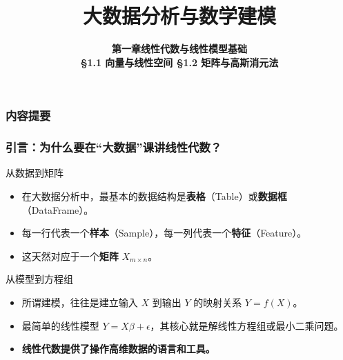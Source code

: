 \usepackage{nicematrix}


\title[大数据分析与数学建模]{\texorpdfstring{\LARGE \bfseries 大数据分析与数学建模}{大数据分析与数学建模}}
\author[线性代数基础(1)]
{\Large \bfseries 第一章\quad 线性代数与线性模型基础 \\ \vspace{0.5em} \large \S 1.1 向量与线性空间 \quad \S 1.2 矩阵与高斯消元法}
\date{}





\begin{frame}
\titlepage
\end{frame}


\begin{frame}
\frametitle{内容提要}
\tableofcontents
\end{frame}


\begin{frame}
\frametitle{引言：为什么要在“大数据”课讲线性代数？}

\begin{block}{从数据到矩阵}
\begin{itemize}
    \item 在大数据分析中，最基本的数据结构是\textbf{表格}（Table）或\textbf{数据框}（DataFrame）。
    \item 每一行代表一个\textbf{样本}（Sample），每一列代表一个\textbf{特征}（Feature）。
    \item 这天然对应于一个\textbf{矩阵} $X_{m \times n}$。
\end{itemize}
\end{block}

\pause

\begin{block}{从模型到方程组}
\begin{itemize}
    \item 所谓建模，往往是建立输入 $X$ 到输出 $Y$ 的映射关系 $Y = f(X)$。
    \item 最简单的线性模型 $Y = X\beta + \epsilon$，其核心就是解线性方程组或最小二乘问题。
    \item \textbf{线性代数提供了操作高维数据的语言和工具。}
\end{itemize}
\end{block}

\end{frame}


